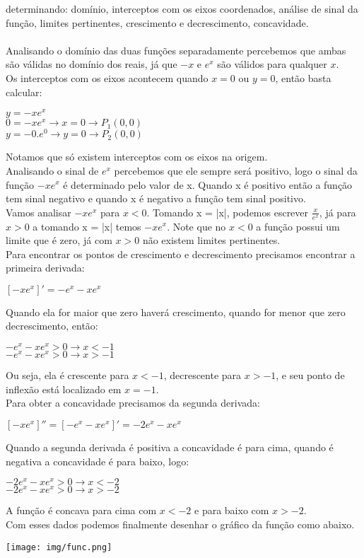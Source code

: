 \documentclass[12pt]{article}
\begin{document}
\begin{enumerate}
	determinando: domínio, interceptos com os eixos coordenados, análise de sinal da função, limites pertinentes, crescimento e decrescimento, concavidade.\\
	\\
	Analisando o domínio das duas funções separadamente percebemos que ambas são válidas no domínio dos reais, já que $-x$ e $e^x$ são válidos para qualquer $x$.\\
	Os interceptos com os eixos acontecem quando $x=0$ ou $y=0$, então basta calcular:
	\begin{center}
		$ y =  -xe^x$\\
		$ 0 =  -xe^x \rightarrow x = 0 \rightarrow P_1(0,0) $\\
		$ y =  -0.e^0 \rightarrow y = 0 \rightarrow P_2(0,0) $
	\end{center}
	Notamos que só existem interceptos com os eixos na origem.
	\\
	Analisando o sinal de $e^x$ percebemos que ele sempre será positivo, logo o sinal da função $-xe^x$ é determinado pelo valor de x. Quando x é positivo então a função tem sinal negativo e quando x é negativo a função tem sinal positivo.
	\\
	Vamos analisar $-xe^x$ para $x<0$. Tomando x = |x|, podemos escrever $\frac{x}{e^x}$, já para $x>0$ a tomando x = |x| temos $-xe^x$. Note que no $x<0$ a função possui um limite que é zero, já com $x>0$ não existem limites pertinentes.
	\\
	Para encontrar os pontos de crescimento e decrescimento precisamos encontrar a primeira derivada:
	\begin{center}
		$ \left[ -xe^x \right] ' =  -e^x-xe^x $
	\end{center}
	Quando ela for maior que zero haverá crescimento, quando for menor que zero decrescimento, então:
	\begin{center}
		$ -e^x-xe^x > 0 \rightarrow x < -1$\\
		$ -e^x-xe^x > 0 \rightarrow x > -1$
	\end{center}
	Ou seja, ela é crescente para $x<-1$, decrescente para $x>-1$, e seu ponto de inflexão está localizado em $x=-1$.
	\\
	Para obter a concavidade precisamos da segunda derivada:
	\begin{center}
		$ \left[ -xe^x \right] '' =  \left[ -e^x-xe^x \right] ' = -2e^x-xe^x $
	\end{center}
	Quando a segunda derivada é positiva a concavidade é para cima, quando é negativa a concavidade é para baixo, logo:
	\begin{center}
		$ -2e^x-xe^x > 0 \rightarrow x < -2$\\
		$ -2e^x-xe^x > 0 \rightarrow x > -2$
	\end{center}
	A função é concava para cima com $x<-2$ e para baixo com $x>-2$.\\
	Com esses dados podemos finalmente desenhar o gráfico da função como abaixo.
	\begin{center}
		\texttt{[image: img/func.png]}
	\end{center}
	

\end{enumerate}
\end{document}

